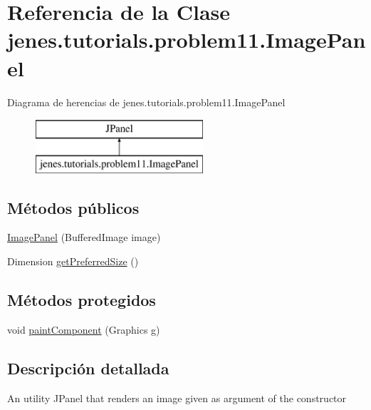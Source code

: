 \hypertarget{classjenes_1_1tutorials_1_1problem11_1_1_image_panel}{\section{Referencia de la Clase jenes.\-tutorials.\-problem11.\-Image\-Panel}
\label{classjenes_1_1tutorials_1_1problem11_1_1_image_panel}
}
Diagrama de herencias de jenes.\-tutorials.\-problem11.\-Image\-Panel\begin{figure}[H]
\begin{center}
\leavevmode
\includegraphics[height=2.000000cm]{classjenes_1_1tutorials_1_1problem11_1_1_image_panel}
\end{center}
\end{figure}
\subsection*{Métodos públicos}
\begin{DoxyCompactItemize}
\item 
\hyperlink{classjenes_1_1tutorials_1_1problem11_1_1_image_panel_a72e9d512f6d00f9ab6fd18bf052f35fd}{Image\-Panel} (Buffered\-Image image)
\item 
Dimension \hyperlink{classjenes_1_1tutorials_1_1problem11_1_1_image_panel_afa537b7985f0ccfc8ad9896df39595c7}{get\-Preferred\-Size} ()
\end{DoxyCompactItemize}
\subsection*{Métodos protegidos}
\begin{DoxyCompactItemize}
\item 
void \hyperlink{classjenes_1_1tutorials_1_1problem11_1_1_image_panel_a734663d1d6aeb4f2e02e788db04a1444}{paint\-Component} (Graphics g)
\end{DoxyCompactItemize}


\subsection{Descripción detallada}
An utility J\-Panel that renders an image given as argument of the constructor 

